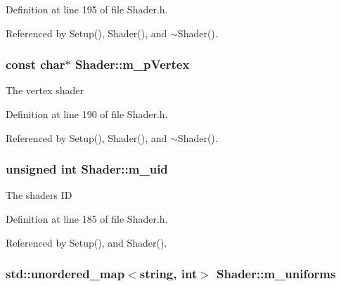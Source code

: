 Definition at line 195 of file Shader.\+h.



Referenced by Setup(), Shader(), and $\sim$\+Shader().

\subsubsection[{\texorpdfstring{m\+\_\+p\+Vertex}{m_pVertex}}]{\setlength{\rightskip}{0pt plus 5cm}const char$\ast$ Shader\+::m\+\_\+p\+Vertex\hspace{0.3cm}{\ttfamily [private]}}\hypertarget{class_shader_a58cc309451a90bf5cccc5216d5e1ceb6}{}\label{class_shader_a58cc309451a90bf5cccc5216d5e1ceb6}


The vertex shader 



Definition at line 190 of file Shader.\+h.



Referenced by Setup(), Shader(), and $\sim$\+Shader().

\subsubsection[{\texorpdfstring{m\+\_\+uid}{m_uid}}]{\setlength{\rightskip}{0pt plus 5cm}unsigned int Shader\+::m\+\_\+uid\hspace{0.3cm}{\ttfamily [private]}}\hypertarget{class_shader_a03d48d89f5a68e54fb26670ec870a240}{}\label{class_shader_a03d48d89f5a68e54fb26670ec870a240}


The shaders ID 



Definition at line 185 of file Shader.\+h.



Referenced by Setup(), and Shader().

\subsubsection[{\texorpdfstring{m\+\_\+uniforms}{m_uniforms}}]{\setlength{\rightskip}{0pt plus 5cm}std\+::unordered\+\_\+map$<${\bf string}, int$>$ Shader\+::m\+\_\+uniforms\hspace{0.3cm}{\ttfamily [private]}}\hypertarget{class_shader_a103462c159aa15d542e986031df0b892}{}\label{class_shader_a103462c159aa15d542e986031df0b892}


